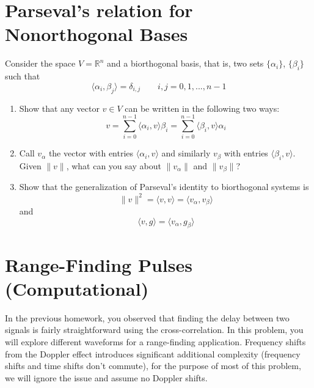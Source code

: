 \documentclass[12pt]{article}
\newcommand{\0}{\mathbf{0}}
\newcommand{\1}{\mathbf{1}}
\begin{document}
\section{Parseval's relation for Nonorthogonal Bases}
Consider the space $V=\mathbb{R}^n$ and a biorthogonal basis, that is, two sets $\{\alpha_i\}$, $\{\beta_i\}$ such that
\begin{equation}
    \langle \alpha_i, \beta_j \rangle = \delta_{i,j} \qquad i,j = 0,1,...,n-1
\end{equation}
\begin{enumerate}
    \item Show that any vector $v \in V$ can be written in the following two ways:
    \begin{equation}
        v = \sum_{i=0}^{n-1} \langle \alpha_i, v \rangle \beta_i = \sum_{i=0}^{n-1} \langle \beta_i, v \rangle \alpha_i
    \end{equation}
    \item Call $v_\alpha$ the vector with entries $\langle \alpha_i, v\rangle$ and similarly $v_\beta$ with entries $\langle \beta_i, v \rangle$. Given $\|v\|$, what can you say about $\|v_\alpha\|$ and $\|v_\beta\|$?
    \item Show that the generalization of Parseval's identity to biorthogonal systems is
    \begin{equation}
        \|v\|^2 = \langle v, v \rangle = \langle v_\alpha, v_\beta \rangle
    \end{equation}
    and
    \begin{equation}
        \langle v, g \rangle = \langle v_\alpha, g_\beta \rangle
    \end{equation}
\end{enumerate}


\pagebreak
\section{Range-Finding Pulses (Computational)}
In the previous homework, you observed that finding the delay between two signals is fairly straightforward using the cross-correlation.
In this problem, you will explore different waveforms for a range-finding application. 
Frequency shifts from the Doppler effect introduces significant additional complexity (frequency shifts and time shifts don't commute), for the purpose of most of this problem, we will ignore the issue and assume no Doppler shifts.
\end{document}
